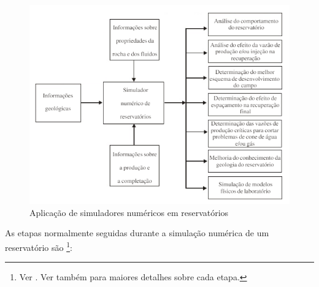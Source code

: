 \begin{figure}[!ht]
	\centering
	\includegraphics[width=.75\textwidth]{figs/revisao/revisao_simsec1}
	\caption{Aplica\c{c}\~{a}o de simuladores num\'{e}ricos em reservat\'{o}rios \cite[p. 522]{engres}}
	\label{fig:revisao_simsec1}
\end{figure}  

As etapas normalmente seguidas durante a simula\c{c}\~{a}o num\'{e}rica de um reservat\'{o}rio s\~{a}o \footnote{Ver \cite[pp. 523--524]{engres}. Ver tamb\'{e}m \cite{fanchi} para maiores detalhes sobre cada etapa.}:

